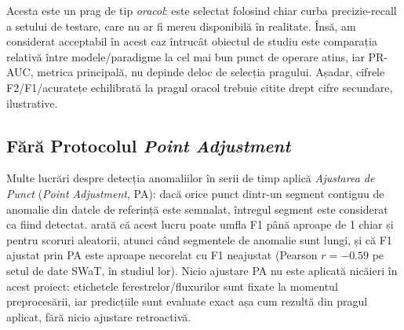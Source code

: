 Acesta este un prag de tip \emph{oracol}: este selectat folosind chiar curba precizie-recall a setului de testare, care nu ar fi mereu disponibilă în realitate.
Însă, am considerat acceptabil în acest caz întrucât obiectul de studiu este comparația relativă între modele/paradigme la cel mai bun punct de operare atins, iar PR-AUC, metrica principală, nu depinde deloc de selecția pragului. Așadar, cifrele F2/F1/acuratețe echilibrată la pragul oracol trebuie citite drept cifre secundare, ilustrative.

\subsection{Fără Protocolul \emph{Point Adjustment}}

Multe lucrări despre detecția anomaliilor în serii de timp aplică \emph{Ajustarea de Punct} (\emph{Point Adjustment}, PA): dacă orice punct dintr-un segment contiguu de anomalie din datele de referință este semnalat, întregul segment este considerat ca fiind detectat. 
\textcite{kim2022rigorous} arată că acest lucru poate umfla F1 până aproape de 1 chiar și pentru scoruri aleatorii, atunci când segmentele de anomalie sunt lungi, și că F1 ajustat prin PA este aproape necorelat cu F1 neajustat (Pearson $r=-0.59$ pe setul de date SWaT, în studiul lor). Nicio ajustare PA nu este aplicată nicăieri în acest proiect: etichetele ferestrelor/fluxurilor sunt fixate la momentul preprocesării, iar predicțiile sunt evaluate exact așa cum rezultă din pragul aplicat, fără nicio ajustare retroactivă.